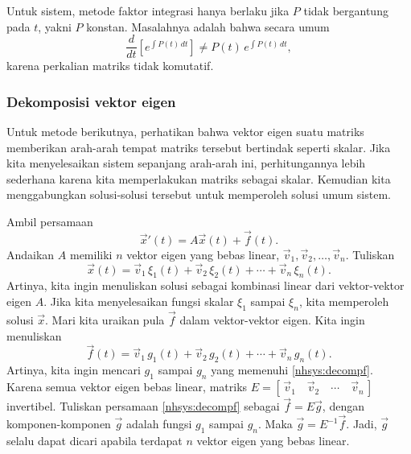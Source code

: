 Untuk sistem, metode faktor integrasi
hanya berlaku jika $P$ tidak bergantung pada $t$, yakni
$P$ konstan.  Masalahnya
adalah bahwa secara umum
\begin{equation*}
\frac{d}{dt} \left[ e^{\int P(t)\,dt} \right] \neq P(t) \, e^{\int P(t)\,dt} ,
\end{equation*}
karena perkalian matriks tidak komutatif.

\subsubsection{Dekomposisi vektor eigen}

Untuk metode berikutnya, perhatikan bahwa vektor eigen suatu matriks memberikan 
arah-arah tempat matriks tersebut bertindak seperti skalar.  Jika kita menyelesaikan
sistem sepanjang arah-arah ini, perhitungannya lebih sederhana karena kita
memperlakukan matriks sebagai skalar.  Kemudian kita
menggabungkan solusi-solusi tersebut untuk memperoleh solusi umum
sistem.

Ambil persamaan
\begin{equation} \label{nhsys:ednhsys}
{\vec{x}}' (t) = A \vec{x}(t) + \vec{f}(t) .
\end{equation}
Andaikan $A$ memiliki $n$ vektor eigen yang bebas linear,
$\vec{v}_1, \vec{v}_2, \ldots, \vec{v}_n$.  Tuliskan
\begin{equation} \label{nhsys:decompx}
\vec{x}(t) =
\vec{v}_1 \, \xi_1(t) + 
\vec{v}_2 \, \xi_2(t) + \cdots +
\vec{v}_n \, \xi_n(t) .
\end{equation}
Artinya, kita ingin menuliskan solusi sebagai kombinasi linear dari
vektor-vektor eigen $A$.
Jika kita menyelesaikan fungsi skalar $\xi_1$ sampai $\xi_n$, kita memperoleh
solusi $\vec{x}$.
Mari kita uraikan pula $\vec{f}$ dalam vektor-vektor eigen.  Kita ingin menuliskan
\begin{equation} \label{nhsys:decompf}
\vec{f}(t) =
\vec{v}_1 \, g_1(t) + 
\vec{v}_2 \, g_2(t) + \cdots +
\vec{v}_n \, g_n(t) .
\end{equation}
Artinya, kita ingin mencari $g_1$ sampai $g_n$ yang memenuhi
\eqref{nhsys:decompf}.  Karena semua vektor eigen
bebas linear, matriks
$E = [\, \vec{v}_1 \quad \vec{v}_2 \quad \cdots \quad \vec{v}_n \,]$
invertibel.  Tuliskan persamaan \eqref{nhsys:decompf}
sebagai $\vec{f} = E \vec{g}$, dengan komponen-komponen
$\vec{g}$ adalah fungsi $g_1$ sampai $g_n$.
Maka $\vec{g} = E^{-1} \vec{f}$.
Jadi, $\vec{g}$ selalu dapat dicari apabila terdapat
$n$ vektor eigen yang bebas linear.

